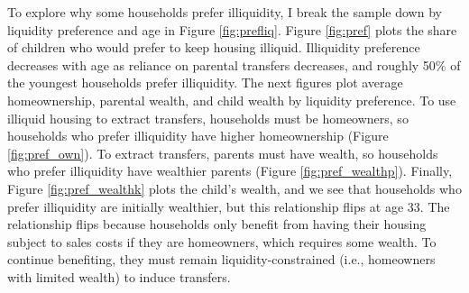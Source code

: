 \documentclass[12pt]{article}
\begin{document}
To explore why some households prefer illiquidity, I break the sample down by liquidity preference and age in Figure \ref{fig:prefliq}. Figure \ref{fig:pref} plots the share of children who would prefer to keep housing illiquid. Illiquidity preference decreases with age as reliance on parental transfers decreases, and roughly 50\% of the youngest households prefer illiquidity. The next figures plot average homeownership, parental wealth, and child wealth by liquidity preference. To use illiquid housing to extract transfers, households must be homeowners, so households who prefer illiquidity have higher homeownership (Figure \ref{fig:pref_own}). To extract transfers, parents must have wealth, so households who prefer illiquidity have wealthier parents (Figure \ref{fig:pref_wealthp}). Finally, Figure \ref{fig:pref_wealthk} plots the child's wealth, and we see that households who prefer illiquidity are initially wealthier, but this relationship flips at age 33. The relationship flips because households only benefit from having their housing subject to sales costs if they are homeowners, which requires some wealth. To continue benefiting, they must remain liquidity-constrained (i.e., homeowners with limited wealth) to induce transfers.
\end{document}
